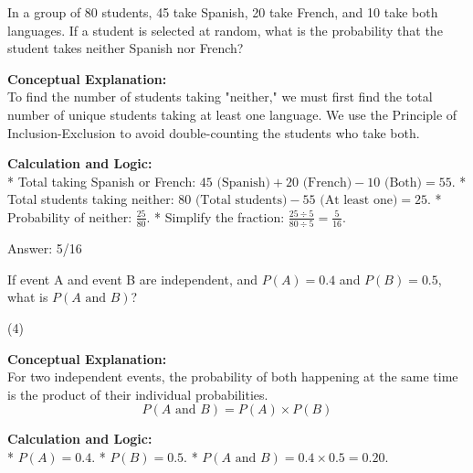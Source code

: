 \documentclass[11pt,paper=a4,answers]{exam}
\begin{document}
\begin{questions}
\vspace{60pt}

\question
In a group of 80 students, 45 take Spanish, 20 take French, and 10 take both languages. If a student is selected at random, what is the probability that the student takes neither Spanish nor French?

\begin{solution}
\textbf{Conceptual Explanation:} \\
To find the number of students taking "neither," we must first find the total number of unique students taking at least one language. We use the Principle of Inclusion-Exclusion to avoid double-counting the students who take both.

\vspace{30pt}

\textbf{Calculation and Logic:} \\
* Total taking Spanish or French: $45 \text{ (Spanish)} + 20 \text{ (French)} - 10 \text{ (Both)} = 55$.
* Total students taking neither: $80 \text{ (Total students)} - 55 \text{ (At least one)} = 25$.
* Probability of neither: $\frac{25}{80}$.
* Simplify the fraction: $\frac{25 \div 5}{80 \div 5} = \frac{5}{16}$.

\vspace{30pt}

Answer: \colorbox{yellow!100}{5/16}
\end{solution}

\vspace{60pt}

\question
If event A and event B are independent, and $P(A) = 0.4$ and $P(B) = 0.5$, what is $P(A \text{ and } B)$?
\begin{tasks}(4)
\end{tasks}

\begin{solution}
\textbf{Conceptual Explanation:} \\
For two independent events, the probability of both happening at the same time is the product of their individual probabilities.
\[ P(A \text{ and } B) = P(A) \times P(B) \]

\vspace{30pt}

\textbf{Calculation and Logic:} \\
* $P(A) = 0.4$.
* $P(B) = 0.5$.
* $P(A \text{ and } B) = 0.4 \times 0.5 = 0.20$.


\end{solution}
\end{questions}
\end{document}
